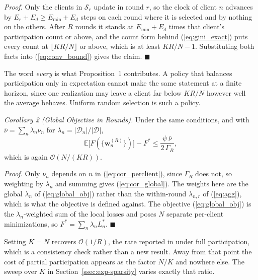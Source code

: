 \documentclass[journal]{IEEEtran}
\newcommand{\rev}[1]{#1}
\begin{document}
\rev{\textit{Proof.} Only the clients in $\mathcal{S}_r$ update in round $r$, so the clock of client $n$ advances by $E_r + E_d \ge E_{\min} + E_d$ steps on each round where it is selected and by nothing on the others. After $R$ rounds it stands at $E_{\min}+E_d$ times that client's participation count or above, and the count form behind (\ref{eq:gini_exact}) puts every count at $\lfloor KR/N \rfloor$ or above, which is at least $KR/N - 1$. Substituting both facts into (\ref{eq:conv_bound}) gives the claim. \hfill$\blacksquare$}

\rev{The word \emph{every} is what Proposition~1 contributes. A policy that balances participation only in expectation cannot make the same statement at a finite horizon, since one realization may leave a client far below $KR/N$ however well the average behaves. Uniform random selection is such a policy.}

\rev{\textit{Corollary 2 (Global Objective in Rounds).} Under the same conditions, and with $\bar{\nu} = \sum_{n} \lambda_n \nu_n$ for $\lambda_n = |\mathcal{D}_n| / |\mathcal{D}|$,}
\begin{equation}
\mathbb{E}\bigl[F(\{\bm{w}_n^{(R)}\})\bigr] - F^{*} \le \frac{\psi\, \bar{\nu}}{2\,\Gamma_R},
\label{eq:cor_global}
\end{equation}
\rev{which is again $\mathcal{O}(N/(KR))$.}

\rev{\textit{Proof.} Only $\nu_n$ depends on $n$ in (\ref{eq:cor_perclient}), since $\Gamma_R$ does not, so weighting by $\lambda_n$ and summing gives (\ref{eq:cor_global}). The weights here are the global $\lambda_n$ of (\ref{eq:global_obj}) rather than the within-round $\lambda_{n,r}$ of (\ref{eq:agg}), which is what the objective is defined against. The objective (\ref{eq:global_obj}) is the $\lambda_n$-weighted sum of the local losses and \cite{mu2024fedtskd} poses $N$ separate per-client minimizations, so $F^{*} = \sum_n \lambda_n L_n^{*}$. \hfill$\blacksquare$}

\rev{Setting $K = N$ recovers $\mathcal{O}(1/R)$, the rate reported in \cite{mu2024fedtskd} under full participation, which is a consistency check rather than a new result. Away from that point the cost of partial participation appears as the factor $N/K$ and nowhere else. The sweep over $K$ in Section~\ref{ssec:exp-sparsity} varies exactly that ratio.}
\end{document}
